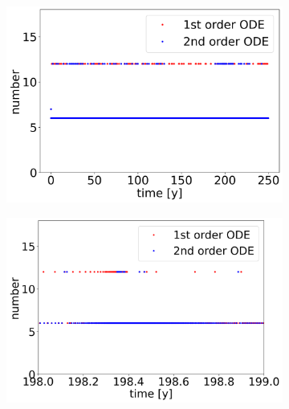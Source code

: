 \begin{figure}[H]
    \centering
    \begin{subfigure}{0.32\textwidth}
    	\centering
    	\includegraphics[width=1\textwidth]{images/TANDEMcompareFormulationstimeEvolutionRHSall.png}
    \end{subfigure}
    \begin{subfigure}{0.32\textwidth}
    	\centering
    	\includegraphics[width=1\textwidth]{images/TANDEMcompareFormulationstimeEvolutionRHSsurroundings.png}
    \end{subfigure}
    \begin{subfigure}{0.32\textwidth}
    	\centering

\end{subfigure}
\end{figure}
